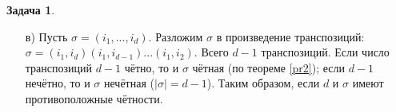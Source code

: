 \documentclass[12pt]{article}
\newtheorem{theorem}{Теорема}
\theoremstyle{definition}
\newtheorem{zad}{Задача}[section]
\begin{document}
\begin{zad}
\begin{itemize}
\begin{theorem}
\end{theorem}
\begin{proof}
Пусть количество транспозиций $k$. Докажем утверждение по индукции. База: $k=0$ (0 транспозиций дают чётную перестановку). Прежположим, что для $k-1$ утверждение верно. Тогда для $k$ утверждение верно, т.к. домножение на транспозицию меняет чётность перестановки (по предложению \ref{pr1}), а числа $k-1$ и $k$ также имеют противоположные чётности.
\end{proof}
\item[в)] Пусть $\sigma=(i_1,...,i_d)$. Разложим $\sigma$ в произведение транспозиций: $\sigma=(i_1,i_d)(i_1,i_{d-1})...(i_1,i_2)$. Всего $d-1$ транспозиций. Если число транспозиций $d-1$ чётно, то и $\sigma$ чётная (по теореме \ref{pr2}); если $d-1$ нечётно, то и $\sigma$ нечётная ($|\sigma|=d-1$). Таким образом, если $d$ и $\sigma$ имеют противоположные чётности.
\end{itemize}
\end{zad}
\end{document}

